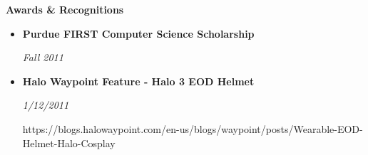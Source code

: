 \documentclass[11pt]{article}
\begin{document}
	\begin{flushleft}
		\textbf{Awards \& Recognitions}
		\hrulefill
	\end{flushleft}

	\begin{center}

	\begin{minipage}{0.95\linewidth}
	\begin{itemize}
		\itemsep0em
			\item 
				\begin{minipage}{0.75\linewidth}
				\begin{flushleft}
				\textbf{Purdue FIRST Computer Science Scholarship}
				\end{flushleft}
				\end{minipage}
				\hfill
				\begin{minipage}{0.23\linewidth}
				\begin{flushright}
				\textit{Fall 2011}
				\end{flushright}
				\end{minipage}
			\item 
				\begin{minipage}{0.75\linewidth}
				\begin{flushleft}
				\textbf{Halo Waypoint Feature - Halo 3  EOD Helmet}
				\end{flushleft}
				\end{minipage}
				\hfill
				\begin{minipage}{0.23\linewidth}
				\begin{flushright}
				\textit{1/12/2011}
				\end{flushright}
				\end{minipage}
				\footnotesize https://blogs.halowaypoint.com/en-us/blogs/waypoint/posts/Wearable-EOD-Helmet-Halo-Cosplay
	\end{itemize}
	\end{minipage}

	\end{center}
\end{document}
